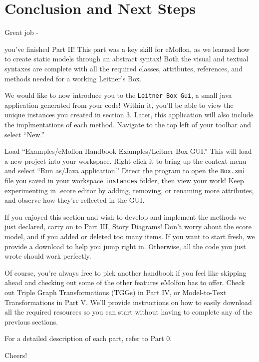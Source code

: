 \genHeader
\section{Conclusion and Next Steps}

\hypertarget{conclusion}{Great job -} you've finished Part II! This part was a key skill for eMoflon, as we learned how to create static models through an
abstract syntax! Both the visual and textual syntaxes are complete with all the required classes, attributes, references, and methods needed for a working
Leitner's Box.

We would like to now introduce you to the \texttt{Leitner Box Gui}, a small java application generated from your code! Within it, you'll be able to view the
unique instances you created in section 3. Later, this application will also include the implmentations of each method. Navigate to the top left of your toolbar
and select ``New.''

Load ``Examples/eMoflon Handbook Examples/Leitner Box GUI.'' This will load a new project into your workspace. Right click it to bring up the context menu and
select ``Run as/Java application.'' Direct the program to open the \texttt{Box.xmi} file you saved in your workspace \texttt{instances} folder, then view your
work! Keep experimenting in .ecore editor by adding, removing, or renaming more attributes, and observe how they're reflected in the GUI.

If you enjoyed this section and wish to develop and implement the methods we just declared, carry on to Part III, Story Diagrams! Don't worry about the ecore
model, and if you added or deleted too many items. If you want to start fresh, we provide a download to help you jump right in. Otherwise, all the code you just
wrote should work perfectly.

Of course, you're always free to pick another handbook if you feel like skipping ahead and checking out some of the other features eMolfon has to offer. Check
out Triple Graph Transformations (TGGs)  in Part IV, or Model-to-Text Transformations in Part V. We'll provide instructions on how to easily download all the
required resources so you can start without having to complete any of the previous sections.

For a detailed description of each part, refer to Part 0.

Cheers!